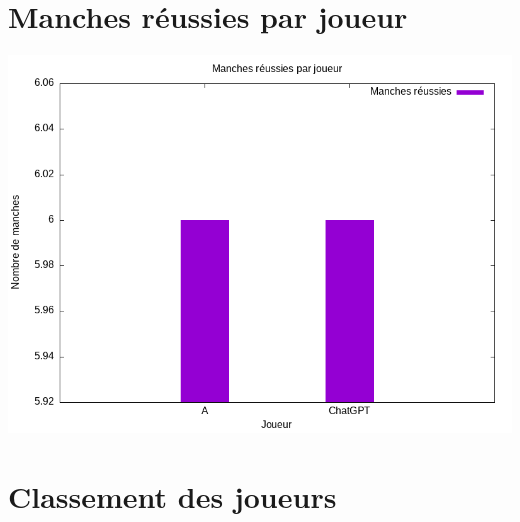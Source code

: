 \documentclass{article}
\begin{document}
\section*{Manches réussies par joueur}
\includegraphics[width=\textwidth]{../Graphiques/manches_reussies_par_joueur.png}

\section*{Classement des joueurs}

\end{document}
